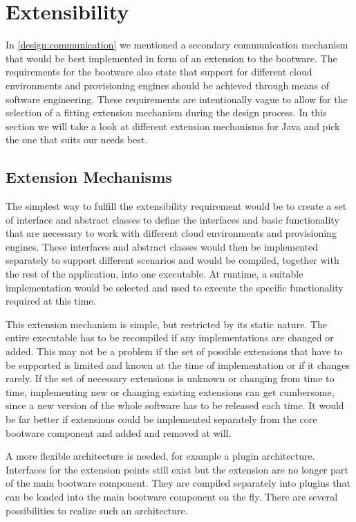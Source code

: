 \section{Extensibility}
\label{design:extensibility}

In \autoref{design:communication} we mentioned a secondary communication mechanism that would be best implemented in form of an extension to the bootware.
The requirements for the bootware also state that support for different cloud environments and provisioning engines should be achieved through means of software engineering.
These requirements are intentionally vague to allow for the selection of a fitting extension mechanism during the design process.
In this section we will take a look at different extension mechanisms for Java and pick the one that suits our needs best.

\subsection{Extension Mechanisms}

The simplest way to fulfill the extensibility requirement would be to create a set of interface and abstract classes to define the interfaces and basic functionality that are necessary to work with different cloud environments and provisioning engines.
These interfaces and abstract classes would then be implemented separately to support different scenarios and would be compiled, together with the rest of the application, into one executable.
At runtime, a suitable implementation would be selected and used to execute the specific functionality required at this time.

This extension mechanism is simple, but restricted by its static nature.
The entire executable has to be recompiled if any implementations are changed or added.
This may not be a problem if the set of possible extensions that have to be supported is limited and known at the time of implementation or if it changes rarely.
If the set of necessary extensions is unknown or changing from time to time, implementing new or changing existing extensions can get cumbersome, since a new version of the whole software has to be released each time.
It would be far better if extensions could be implemented separately from the core bootware component and added and removed at will.

A more flexible architecture is needed, for example a plugin architecture.
Interfaces for the extension points still exist but the extension are no longer part of the main bootware component.
They are compiled separately into plugins that can be loaded into the main bootware component on the fly.
There are several possibilities to realize such an architecture.

